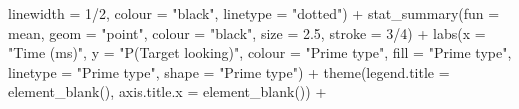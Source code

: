 \documentclass[
  letterpaper,
  DIV=11,
  numbers=noendperiod]{scrartcl}
\newenvironment{Shaded}{\begin{snugshade}}{\end{snugshade}}
\newcommand{\AttributeTok}[1]{\textcolor[rgb]{0.40,0.45,0.13}{#1}}
\newcommand{\DecValTok}[1]{\textcolor[rgb]{0.68,0.00,0.00}{#1}}
\newcommand{\FloatTok}[1]{\textcolor[rgb]{0.68,0.00,0.00}{#1}}
\newcommand{\FunctionTok}[1]{\textcolor[rgb]{0.28,0.35,0.67}{#1}}
\newcommand{\NormalTok}[1]{\textcolor[rgb]{0.00,0.23,0.31}{#1}}
\newcommand{\SpecialCharTok}[1]{\textcolor[rgb]{0.37,0.37,0.37}{#1}}
\newcommand{\StringTok}[1]{\textcolor[rgb]{0.13,0.47,0.30}{#1}}
\begin{document}
\begin{Shaded}
\begin{Highlighting}[]
               \AttributeTok{linewidth =} \DecValTok{1}\SpecialCharTok{/}\DecValTok{2}\NormalTok{,}
               \AttributeTok{colour =} \StringTok{"black"}\NormalTok{,}
               \AttributeTok{linetype =} \StringTok{"dotted"}\NormalTok{) }\SpecialCharTok{+}
    \FunctionTok{stat\_summary}\NormalTok{(}\AttributeTok{fun =}\NormalTok{ mean,}
                 \AttributeTok{geom =} \StringTok{"point"}\NormalTok{,}
                 \AttributeTok{colour =} \StringTok{"black"}\NormalTok{,}
                 \AttributeTok{size =} \FloatTok{2.5}\NormalTok{,}
                 \AttributeTok{stroke =} \DecValTok{3}\SpecialCharTok{/}\DecValTok{4}\NormalTok{) }\SpecialCharTok{+}
    \FunctionTok{labs}\NormalTok{(}\AttributeTok{x =} \StringTok{"Time (ms)"}\NormalTok{,}
         \AttributeTok{y =} \StringTok{"P(Target looking)"}\NormalTok{,}
         \AttributeTok{colour =} \StringTok{"Prime type"}\NormalTok{,}
         \AttributeTok{fill =} \StringTok{"Prime type"}\NormalTok{,}
         \AttributeTok{linetype =} \StringTok{"Prime type"}\NormalTok{,}
         \AttributeTok{shape =} \StringTok{"Prime type"}\NormalTok{) }\SpecialCharTok{+}
    \FunctionTok{theme}\NormalTok{(}\AttributeTok{legend.title =} \FunctionTok{element\_blank}\NormalTok{(),}
          \AttributeTok{axis.title.x =} \FunctionTok{element\_blank}\NormalTok{()) }\SpecialCharTok{+}
    

\end{Highlighting}
\end{Shaded}
\end{document}
